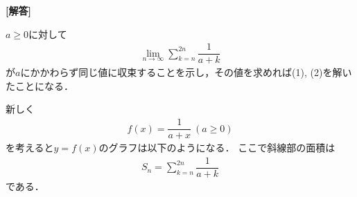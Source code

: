 \documentclass[../../main.tex]{subfiles}
\begin{document}
\begin{oframed}
  
\end{oframed}

{\bf [解答]}

$a \ge 0$に対して
\begin{align}
  \lim_{n\to\infty}\sum_{k=n}^{2n}\dfrac{1}{a+k} \label{eq:1}
\end{align}
が$a$にかかわらず同じ値に収束することを示し，その値を求めれば(1), (2)を解いたことになる．

新しく
\begin{align}
  f(x) = \dfrac{1}{a+x}\ (a\ge0)
\end{align}
を考えると$y=f(x)$のグラフは以下のようになる．
ここで斜線部の面積は
\begin{align}
  S_n=\sum_{k=n}^{2n}\dfrac{1}{a+k} \label{eq:2}
\end{align}
である．
\end{document}
